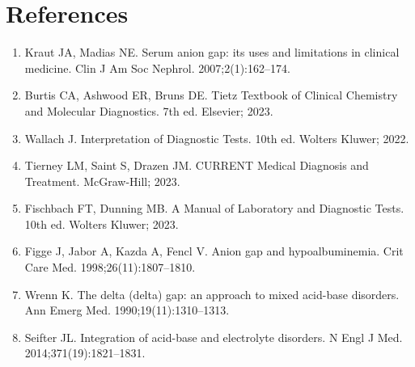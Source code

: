 \section*{References}
\begin{enumerate}
  \item Kraut JA, Madias NE. Serum anion gap: its uses and limitations in clinical medicine. Clin J Am Soc Nephrol. 2007;2(1):162--174.
  \item Burtis CA, Ashwood ER, Bruns DE. Tietz Textbook of Clinical Chemistry and Molecular Diagnostics. 7th ed. Elsevier; 2023.
  \item Wallach J. Interpretation of Diagnostic Tests. 10th ed. Wolters Kluwer; 2022.
  \item Tierney LM, Saint S, Drazen JM. CURRENT Medical Diagnosis and Treatment. McGraw-Hill; 2023.
  \item Fischbach FT, Dunning MB. A Manual of Laboratory and Diagnostic Tests. 10th ed. Wolters Kluwer; 2023.
  \item Figge J, Jabor A, Kazda A, Fencl V. Anion gap and hypoalbuminemia. Crit Care Med. 1998;26(11):1807--1810.
  \item Wrenn K. The delta (delta) gap: an approach to mixed acid-base disorders. Ann Emerg Med. 1990;19(11):1310--1313.
  \item Seifter JL. Integration of acid-base and electrolyte disorders. N Engl J Med. 2014;371(19):1821--1831.
\end{enumerate}

\clearpage

